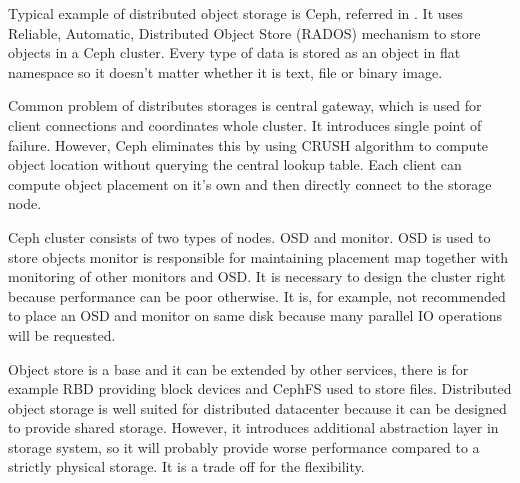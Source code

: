 Typical example of distributed object storage is Ceph, referred in \cite{ceph}. It uses Reliable, Automatic, Distributed Object Store (\Ac{RADOS}) mechanism to store objects in a Ceph cluster. Every type of data is stored as an object in flat namespace so it doesn't matter whether it is text, file or binary image. 

Common problem of distributes storages is central gateway, which is used for client connections and coordinates whole cluster. It introduces single point of failure. However, Ceph eliminates this by using \Ac{CRUSH} algorithm to compute object location without querying the central lookup table. Each client can compute object placement on it's own and then directly connect to the storage node.

Ceph cluster consists of two types of nodes. \Ac{OSD} and monitor. \Ac{OSD} is used to store objects  monitor is responsible for maintaining placement map together with monitoring of other monitors and \Ac{OSD}. It is necessary to design the cluster right because performance can be poor otherwise. It is, for example, not recommended to place an \Ac{OSD} and monitor on same disk because many parallel \Ac{IO} operations will be requested.

Object store is a base and it can be extended by other services, there is for example \Ac{RBD} providing block devices and CephFS used to store files. Distributed object storage is well suited for distributed datacenter because it can be designed to provide shared storage. However, it introduces additional abstraction layer in storage system, so it will probably provide worse performance compared to a strictly physical storage. It is a trade off for the flexibility.
